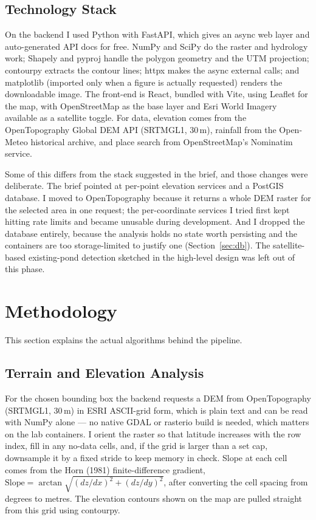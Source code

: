 \documentclass[manuscript,screen]{acmart}
\begin{document}
\subsection{Technology Stack}
On the backend I used Python with FastAPI, which gives an async web layer and
auto-generated API docs for free. NumPy and SciPy do the raster and hydrology work;
Shapely and pyproj handle the polygon geometry and the UTM projection; contourpy
extracts the contour lines; httpx makes the async external calls; and matplotlib
(imported only when a figure is actually requested) renders the downloadable image.
The front-end is React, bundled with Vite, using Leaflet for the map, with
OpenStreetMap as the base layer and Esri World Imagery available as a satellite
toggle. For data, elevation comes from the OpenTopography Global DEM API (SRTMGL1,
30\,m), rainfall from the Open-Meteo historical archive, and place search from
OpenStreetMap's Nominatim service.

Some of this differs from the stack suggested in the brief, and those changes were
deliberate. The brief pointed at per-point elevation services and a PostGIS
database. I moved to OpenTopography because it returns a whole DEM raster for the
selected area in one request; the per-coordinate services I tried first kept
hitting rate limits and became unusable during development. And I dropped the
database entirely, because the analysis holds no state worth persisting and the
containers are too storage-limited to justify one (Section~\ref{sec:db}). The
satellite-based existing-pond detection sketched in the high-level design was left
out of this phase.

\section{Methodology}
\label{sec:methodology}
This section explains the actual algorithms behind the pipeline.

\subsection{Terrain and Elevation Analysis}
For the chosen bounding box the backend requests a DEM from OpenTopography
(SRTMGL1, 30\,m) in ESRI ASCII-grid form, which is plain text and can be read with
NumPy alone --- no native GDAL or rasterio build is needed, which matters on the
lab containers. I orient the raster so that latitude increases with the row index,
fill in any no-data cells, and, if the grid is larger than a set cap, downsample it
by a fixed stride to keep memory in check. Slope at each cell comes from the Horn
(1981) finite-difference gradient,
$\text{Slope}=\arctan\!\sqrt{(dz/dx)^2+(dz/dy)^2}$, after converting the cell
spacing from degrees to metres. The elevation contours shown on the map are pulled
straight from this grid using contourpy.
\end{document}
